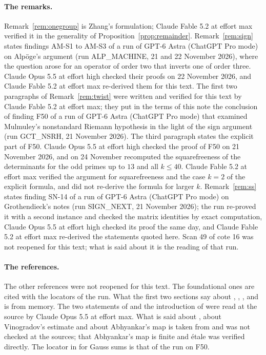 \documentclass[11pt,a4paper]{article}
\theoremstyle{plain}
\theoremstyle{remark}
\begin{document}
\paragraph{The remarks.}
Remark~\ref{rem:onegroup} is Zhang's formulation; Claude Fable 5.2 at effort max verified it in the generality of
Proposition~\ref{prop:remainder}. Remark~\ref{rem:sign} states findings AM-S1 to AM-S3 of a run of GPT-6 Astra
(ChatGPT Pro mode) on Alp\"oge's argument (run ALP\_MACHINE, 21 and 22 November 2026), where the question arose for
an operator of order two that inverts one of order three. Claude Opus 5.5 at effort high checked their proofs on 22 November 2026,
and Claude Fable 5.2 at effort max re-derived them for this text. The first two paragraphs of
Remark~\ref{rem:twist} were written and verified for this text by Claude Fable 5.2 at effort max; they put in the
terms of this note the conclusion of finding F50 of a run of GPT-6 Astra (ChatGPT Pro mode) that examined Mulmuley's
nonstandard Riemann hypothesis in the light of the sign argument (run GCT\_NSRH, 21 November 2026). The third paragraph states the explicit part of
F50. Claude Opus 5.5 at effort high checked the proof of F50 on 21 November 2026, and on 24 November recomputed the
squarefreeness of the determinants for the odd primes up to $13$ and all $k\le40$. Claude Fable 5.2 at effort max verified the argument for squarefreeness
and the case $k=2$ of the explicit formula, and did not re-derive the formula for larger $k$.
Remark~\ref{rem:ss} states finding SN-14 of a run of GPT-6 Astra (ChatGPT Pro mode) on Grothendieck's notes
(run SIGN\_NEXT, 21 November 2026); the run re-proved it with a second instance and checked the matrix identities by exact
computation, Claude Opus 5.5 at effort high checked its proof the same day, and Claude Fable 5.2 at effort max
re-derived the statements quoted here. Scan 49 of cote 16 was not
reopened for this text; what is said about it is the reading of that run.

\paragraph{The references.}
The other references were not reopened for this text. The foundational ones are cited with the locators of the run.
What the first two sections say about \cite{Bombieri}, \cite{WeilI}, \cite{WeilII}, \cite{Kedlaya} and
\cite{Laumon} is from memory. The two statements of \cite{Lafforgue} and the introduction of \cite{Scholl} were read
at the source by Claude Opus 5.5 at effort max. What is said about \cite{KatzLectures}, about Vinogradov's estimate
and about Abhyankar's map is taken from \cite{Zhang} and was not checked at the sources; that Abhyankar's map is
finite and \'etale was verified directly. The locator in \cite{SGA4h} for Gauss sums is that of the run on F50.
\end{document}
